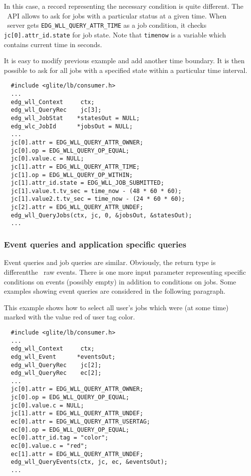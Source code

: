 In this case, a record representing the necessary condition is quite
different. The \LB\ API allows to ask for jobs with a particular status at a
given time. When \LB\ server gets \texttt{EDG\_WLL\_QUERY\_ATTR\_TIME}
as a job condition, it checks \texttt{jc[0].attr\_id.state} for job state. 
Note that \texttt{timenow} is a variable which contains current time in
seconds.

It is easy to modify previous example and add another time boundary. It is then 
possible to ask for all jobs with a specified state within a particular time
interval.
\begin{verbatim}
  #include <glite/lb/consumer.h>
  ...
  edg_wll_Context     ctx;    
  edg_wll_QueryRec    jc[3];
  edg_wll_JobStat    *statesOut = NULL;
  edg_wlc_JobId      *jobsOut = NULL;
  ...
  jc[0].attr = EDG_WLL_QUERY_ATTR_OWNER;
  jc[0].op = EDG_WLL_QUERY_OP_EQUAL;
  jc[0].value.c = NULL;
  jc[1].attr = EDG_WLL_QUERY_ATTR_TIME;
  jc[1].op = EDG_WLL_QUERY_OP_WITHIN;
  jc[1].attr_id.state = EDG_WLL_JOB_SUBMITTED;
  jc[1].value.t.tv_sec = time_now - (48 * 60 * 60);
  jc[1].value2.t.tv_sec = time_now - (24 * 60 * 60);
  jc[2].attr = EDG_WLL_QUERY_ATTR_UNDEF;
  edg_wll_QueryJobs(ctx, jc, 0, &jobsOut, &statesOut);
  ...
\end{verbatim}


\subsubsection{Event queries and application specific queries}
\label{ASQ}
Event queries and job queries are similar. 
Obviously, the return type is different\Dash the \LB\ raw events.
There is one more input parameter
representing specific conditions on events (possibly empty)
in addition to conditions on jobs.
Some examples showing event queries 
are considered in the following paragraph.


\label{ASQ_allred}
This example shows how to select all user's jobs which were (at some time)
marked with the value red of user tag color.
\begin{verbatim}
  #include <glite/lb/consumer.h>
  ...
  edg_wll_Context     ctx;    
  edg_wll_Event      *eventsOut;
  edg_wll_QueryRec    jc[2];
  edg_wll_QueryRec    ec[2];
  ...
  jc[0].attr = EDG_WLL_QUERY_ATTR_OWNER;
  jc[0].op = EDG_WLL_QUERY_OP_EQUAL;
  jc[0].value.c = NULL;
  jc[1].attr = EDG_WLL_QUERY_ATTR_UNDEF;
  ec[0].attr = EDG_WLL_QUERY_ATTR_USERTAG;
  ec[0].op = EDG_WLL_QUERY_OP_EQUAL;
  ec[0].attr_id.tag = "color";
  ec[0].value.c = "red";
  ec[1].attr = EDG_WLL_QUERY_ATTR_UNDEF;
  edg_wll_QueryEvents(ctx, jc, ec, &eventsOut);
  ...
\end{verbatim}

